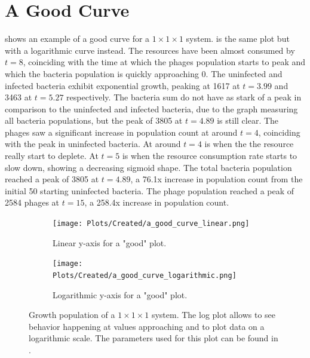 \section{A Good Curve}
\label{sec:results:a_good_curve}
 shows an example of a good curve for a $1\times1\times1$ system. 
 is the same plot but with a logarithmic curve instead. 
The resources have been almost consumed by $t=8$, coinciding with the time at which the phages population starts to peak and which the bacteria population is quickly approaching 0. 
The uninfected and infected bacteria exhibit exponential growth, peaking at 1617 at $t=3.99$ and 3463 at $t=5.27$ respectively. 
The bacteria sum do not have as stark of a peak in comparison to the uninfected and infected bacteria, due to the graph measuring all bacteria populations, but the peak of 3805 at $t=4.89$ is still clear. 
The phages saw a significant increase in population count at around $t=4$, coinciding with the peak in uninfected bacteria. 
At around $t=4$ is when the the resource really start to deplete. 
At $t=5$ is when the resource consumption rate starts to slow down, showing a decreasing sigmoid shape. 
The total bacteria population reached a peak of 3805 at $t=4.89$, a 76.1x increase in population count from the initial 50 starting uninfected bacteria. 
The phage population reached a peak of 2584 phages at $t=15$, a 258.4x increase in population count. 
\begin{figure}[h!]
    \centering
    \begin{subfigure}{1\linewidth}
        \centering
        \captionsetup{width=1\linewidth}
        \texttt{[image: Plots/Created/a\_good\_curve\_linear.png]}
        \caption{
            Linear y-axis for a "good" plot. 
        }
        \label{fig:created:a_good_curve_linear}
    \end{subfigure}
    \hfill
    \begin{subfigure}{1\linewidth}
        \centering
        \captionsetup{width=1\linewidth}
        \texttt{[image: Plots/Created/a\_good\_curve\_logarithmic.png]}
        \caption{
            Logarithmic y-axis for a "good" plot. 
        }
        \label{fig:created:a_good_curve_logarithmic}
    \end{subfigure}
    \caption{
        Growth population of a $1\times1\times1$ system. 
        The log plot allows to see behavior happening at values approaching and to plot data on a logarithmic scale. 
        The parameters used for this plot can be found in . 
    }
    \label{fig:created:a_good_curve}
\end{figure}

